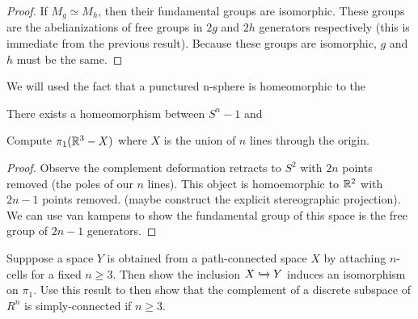 \documentclass[10pt]{article}
\begin{document}
\begin{proof}
	If $M_g \simeq M_h$, then their fundamental groups are isomorphic. These groups are the abelianizations of free groups in $2g$ and $2h$ generators respectively (this is immediate from the previous result). Because these groups are isomorphic, $g$ and $h$ must be the same.
\end{proof}


We will used the fact that a punctured n-sphere is homeomorphic to the 

\begin{proposition}
There exists a homeomorphism between $S^n-1$ and
\end{proposition}

\begin{exercise}[1.2.4]
	Compute $\pi_1(\mathbb{R}^3 - X)$ where $X$ is the union of $n$ lines through the origin.
\end{exercise}

\begin{proof}
	Observe the complement deformation retracts to $S^2$ with $2n$ points removed (the poles of our $n$ lines). This object is homoemorphic to $\mathbb{R}^2$ with $2n-1$ points removed. (maybe construct the explicit stereographic projection). We can use van kampens to show the fundamental group of this space is the free group of $2n-1$ generators.
\end{proof}

\begin{exercise}[1.2.6]
	Supppose a space $Y$ is obtained from a path-connected space $X$ by attaching
	$n$-cells for a fixed $n \geq 3$. Then show the inclusion $X
	\xhookrightarrow{} Y$ induces an isomorphism on $\pi_1$. Use this result to
	then show	that the complement of a discrete subspace of $R^n$ is simply-connected if $n
	\geq 3$.
\end{exercise}
\end{document}
